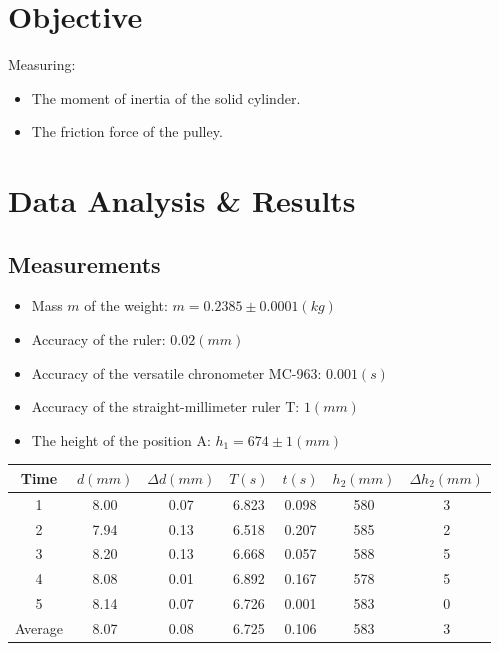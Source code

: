 \documentclass[12pt, a4paper]{article}
\newcommand{\Dt}{\Delta}
\newcommand{\hi}{\section}
\newcommand{\hii}{\subsection}
\begin{document}
\pagebreak

\hi{Objective}
    \par Measuring:
    \begin{itemize}
        \item The moment of inertia of the solid cylinder.
        \item The friction force of the pulley.
    \end{itemize}

\hi{Data Analysis \& Results}
    \hii{Measurements}
        \begin{itemize}
            \item Mass $m$ of the weight: $m = 0.2385 \pm 0.0001 (kg)$
            \item Accuracy of the ruler: $0.02 (mm)$
            \item Accuracy of the versatile chronometer MC-963: $0.001 (s)$
            \item Accuracy of the straight-millimeter ruler T: $1 (mm)$
            \item The height of the position A: $h_{1} = 674 \pm 1 (mm)$
        \end{itemize}

        \begin{center}
            \begin{tabular}{|c|c|c|c|c|c|c|}
                \hline
                \quad Time \quad & \quad $d (mm)$ \quad & \quad $\Dt d (mm)$ \quad
                & \quad $T (s)$ \quad & \quad $t (s)$ \quad & \quad $h_{2} (mm)$ \quad
                & \quad $\Dt h_{2} (mm)$ \quad \\
                \hline
                1       & 8.00 & 0.07 & 6.823 & 0.098 & 580 & 3 \\
                \hline
                2       & 7.94 & 0.13 & 6.518 & 0.207 & 585 & 2 \\
                \hline
                3       & 8.20 & 0.13 & 6.668 & 0.057 & 588 & 5 \\
                \hline
                4       & 8.08 & 0.01 & 6.892 & 0.167 & 578 & 5 \\
                \hline
                5       & 8.14 & 0.07 & 6.726 & 0.001 & 583 & 0 \\
                \hline
                Average & 8.07 & 0.08 & 6.725 & 0.106 & 583 & 3 \\
                \hline
            \end{tabular}
        \end{center}
\end{document}
